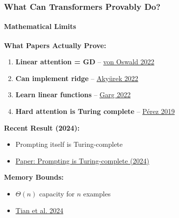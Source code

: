 \documentclass[10pt,aspectratio=169]{beamer}
\begin{document}

\begin{frame}
\frametitle{What Can Transformers Provably Do?}
\framesubtitle{Mathematical Limits}

\textbf{What Papers Actually Prove:}
\begin{enumerate}
    \item \textbf{Linear attention = GD} -- \href{papers/2212.07677_transformers_gradient_descent.pdf}{\color{blue}von Oswald 2022}
    \item \textbf{Can implement ridge} -- \href{papers/2211.15661_learning_algorithm.pdf}{\color{blue}Akyürek 2022}
    \item \textbf{Learn linear functions} -- \href{papers/2208.01066_what_can_transformers_learn.pdf}{\color{blue}Garg 2022}
    \item \textbf{Hard attention is Turing complete} -- \href{papers/1901.03429_turing_completeness.pdf}{\color{blue}Pérez 2019}
\end{enumerate}

\vspace{0.5cm}
\textbf{Recent Result (2024):}
\begin{itemize}
    \item Prompting itself is Turing-complete
    \item \href{papers/2411.01992_prompting_turing_complete.pdf}{\color{blue}Paper: Prompting is Turing-complete (2024)}
\end{itemize}

\vspace{0.5cm}
\textbf{Memory Bounds:}
\begin{itemize}
    \item $\Theta(n)$ capacity for $n$ examples
    \item \href{papers/2405.13718_memory_capacity.pdf}{\color{blue}Tian et al. 2024}
\end{itemize}
\end{frame}

\end{document}
